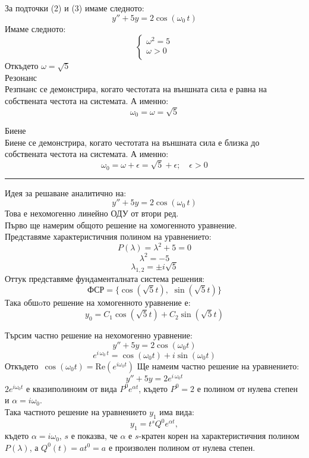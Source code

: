 \documentclass[11pt]{article}
\begin{document}
\begin{flushleft}
    \vspace{0.35cm}
    За подточки (2) и (3) имаме следното:
    $$y'' + 5y = 2 \cos(\omega_0 \, t)$$
    Имаме следното:
    $$
    \begin{cases}
    \omega^2 = 5 \\
    \omega > 0 \\
    \end{cases}
    $$
    Откъдето $\omega = \sqrt{5}$ \\

    \vspace{0.15cm}
    {\huge Резонанс \\}
    Резпнанс се демонстрира, когато честотата на външната сила е равна на собствената честота на системата.
    А именно:
    $$\omega_0 = \omega = \sqrt{5}$$

    \vspace{0.15cm}
    {\huge Биене \\}
    Биене се демонстрира, когато честотата на външната сила е близка до собствената честота на системата.
    А именно:
    $$\omega_0 = \omega + \epsilon = \sqrt{5} + \epsilon; \quad \epsilon > 0$$

    \noindent
    \hrule height 0.1pt
    \vskip 0.2cm

    Идея за решаване аналитично на:
    $$y'' + 5y = 2 \cos(\omega_0 \, t)$$
    \vspace{0.20cm}
    Това е нехомогенно линейно ОДУ от втори ред. \\
    Първо ще намерим общото решение на хомогенното уравнение. \\
    Представяме характеристичния полином на уравнението: \\
    $$P(\lambda) = \lambda^2 + 5 = 0$$
    $$\lambda^2 = -5$$
    $$\lambda_{1,2} = \pm i \sqrt{5}$$
    Оттук представяме фундаменталната система решения:
    $$\text{ФСР} = \{\cos(\sqrt{5}t), \,\, \sin(\sqrt{5}t)\}$$
    Така обшoто решение на хомогенното уравнение е: \\
    $$y_0 = C_1 \cos(\sqrt{5}t) + C_2 \sin(\sqrt{5}t)$$

    Търсим частно решение на нехомогенно уравнение:
    $$y'' + 5y = 2 \cos(\omega_0 t)$$
    $$e^{i\,\omega_0\,t} = \cos(\omega_0 t) + i\sin(\omega_0 t)$$
    Откъдето $\,\cos(\omega_0 t) = \text{Re}(e^{i \omega_0 t})$
    Ще намеим частно решение на уравнението:
    $$y'' + 5y = 2 e^{i\,\omega_0 t}$$
    $2 e^{i \omega_0 t}$ е квазиполиноим от вида $P^0 e^{\alpha t}$,
        където $P^0 = 2$ е полином от нулева степен и $\alpha = i\omega_0$. \\
    Така частното решение на уравнението $y_1$ има вида:
    $$y_1 = t^s Q^0 e^{\alpha t},$$
    където $\alpha = i\omega_0$, $s$ е показва, че $\alpha$ е $s$-кратен корен на характеристичния полином $P(\lambda)$,
        а $Q^0(t) = at^0 = a$ е произволен полином от нулева степен.


\end{flushleft}
\end{document}
